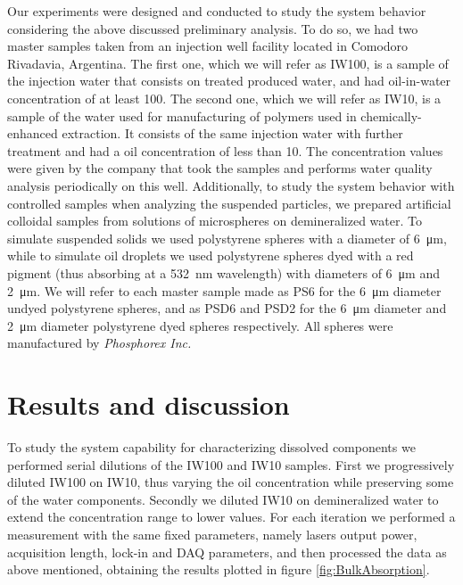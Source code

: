 \documentclass[10pt,authoryear,twocolumn]{article}
\begin{document}
Our experiments were designed and conducted to study the system behavior considering the above discussed preliminary analysis. To do so, we had two master samples taken from an injection well facility located in Comodoro Rivadavia, Argentina. The first one, which we will refer as IW100, is a sample of the injection water that consists on treated produced water, and had oil-in-water concentration of at least \SI{100}{\ppm}. The second one, which we will refer as IW10, is a sample of the water used for manufacturing of polymers used in chemically-enhanced extraction. It consists of the same injection water with further treatment and had a oil concentration of less than \SI{10}{\ppm}. The concentration values were given by the company that took the samples and performs water quality analysis periodically on this well. Additionally, to study the system behavior with controlled samples when analyzing the suspended particles, we prepared artificial colloidal samples from solutions of microspheres on demineralized water. To simulate suspended solids we used polystyrene spheres with a diameter of \SI{6}{\micro\metre}, while to simulate oil droplets we used polystyrene spheres dyed with a red pigment (thus absorbing at a \SI{532}{\nano\metre} wavelength) with diameters of \SI{6}{\micro\metre} and \SI{2}{\micro\metre}. We will refer to each master sample made as PS6 for the \SI{6}{\micro\metre} diameter undyed polystyrene spheres, and as PSD6 and PSD2 for the \SI{6}{\micro\metre} diameter and \SI{2}{\micro\metre} diameter polystyrene dyed spheres respectively. All spheres were manufactured by \emph{Phosphorex Inc.}








\section{Results and discussion}
\label{Results}

To study the system capability for characterizing dissolved components we performed serial dilutions of the IW100 and IW10 samples. First we progressively diluted IW100 on IW10, thus varying the oil concentration while preserving some of the water components. Secondly we diluted IW10 on demineralized water to extend the concentration range to lower values. For each iteration we performed a measurement with the same fixed parameters, namely lasers output power, acquisition length, lock-in and DAQ parameters, and then processed the data as above mentioned, obtaining the results plotted in figure \ref{fig:BulkAbsorption}.
\end{document}
